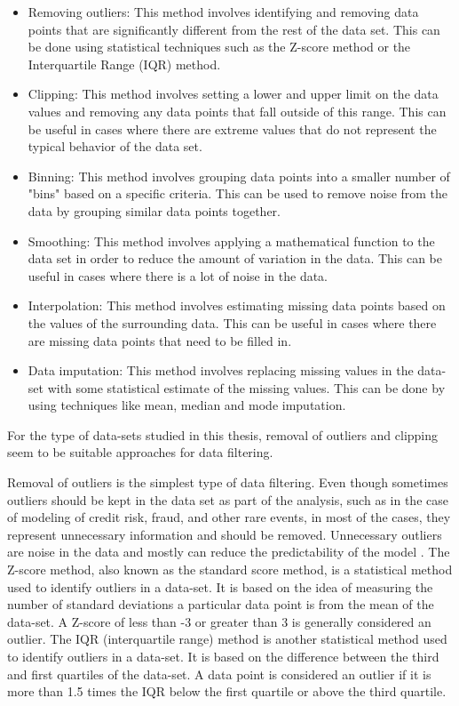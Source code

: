 \begin{itemize}
    \item Removing outliers: This method involves identifying and removing data points that are significantly different from the rest of the data set. This can be done using statistical techniques such as the Z-score method or the Interquartile Range (IQR) method.

    \item Clipping: This method involves setting a lower and upper limit on the data values and removing any data points that fall outside of this range. This can be useful in cases where there are extreme values that do not represent the typical behavior of the data set.

    \item Binning: This method involves grouping data points into a smaller number of "bins" based on a specific criteria. This can be used to remove noise from the data by grouping similar data points together.

    \item Smoothing: This method involves applying a mathematical function to the data set in order to reduce the amount of variation in the data. This can be useful in cases where there is a lot of noise in the data.

    \item Interpolation: This method involves estimating missing data points based on the values of the surrounding data. This can be useful in cases where there are missing data points that need to be filled in.

    \item Data imputation: This method involves replacing missing values in the data-set with some statistical estimate of the missing values. This can be done by using techniques like mean, median and mode imputation.

\end{itemize}
\newpage

For the type of data-sets studied in this thesis, removal of outliers and clipping seem to be suitable approaches for data filtering. 

Removal of outliers is the simplest type of data filtering. Even though sometimes outliers should be kept in the data set as part of the analysis, such as in the case of modeling of credit risk, fraud, and other rare events, in most of the cases, they represent unnecessary information and should be removed. Unnecessary outliers are noise in the data and mostly can reduce the predictability of the model \cite{filter}. The Z-score method, also known as the standard score method, is a statistical method used to identify outliers in a data-set. It is based on the idea of measuring the number of standard deviations a particular data point is from the mean of the data-set. A Z-score of less than -3 or greater than 3 is generally considered an outlier. The IQR (interquartile range) method is another statistical method used to identify outliers in a data-set. It is based on the difference between the third and first quartiles of the data-set. A data point is considered an outlier if it is more than 1.5 times the IQR below the first quartile or above the third quartile.

